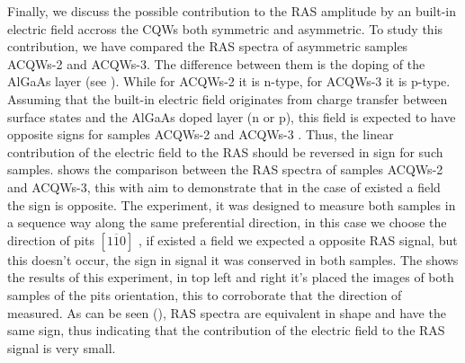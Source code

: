 Finally, we discuss the possible contribution to the RAS amplitude by an built-in electric field accross the CQWs both symmetric and asymmetric. To study this contribution, we have compared the RAS spectra of asymmetric samples \gls{ACQWs}-2 and \gls{ACQWs}-3. The difference between them is the doping of the AlGaAs layer (see ). While for \gls{ACQWs}-2 it is n-type, for \gls{ACQWs}-3 it is p-type. Assuming that the built-in electric field  originates from charge transfer between surface states and  the AlGaAs doped layer (n or p), this field is expected to have opposite signs for samples \gls{ACQWs}-2 and \gls{ACQWs}-3 . Thus, the linear contribution of the electric field to the \gls{RAS} should be reversed in sign for such samples.  shows the comparison between the \gls{RAS} spectra of samples \gls{ACQWs}-2 and \gls{ACQWs}-3,  this with aim to demonstrate that  in the case of existed a field the sign is opposite.    The experiment, it was designed to measure both samples in a sequence way along the same preferential direction, in this case we choose the direction of pits $\left[1\overline{1}0\right]$ \cite{weyher2010defect}, if existed a field we expected a opposite RAS signal, but this doesn't occur, the sign in signal it was conserved in both samples. The  shows the results of this experiment, in top left and right it's placed the images of both samples of the pits orientation, this to corroborate that the direction of measured. 
As can be seen (), RAS spectra are equivalent  in shape and have the same sign, thus indicating that the contribution of the electric field to the \gls{RAS} signal is very small. \\
